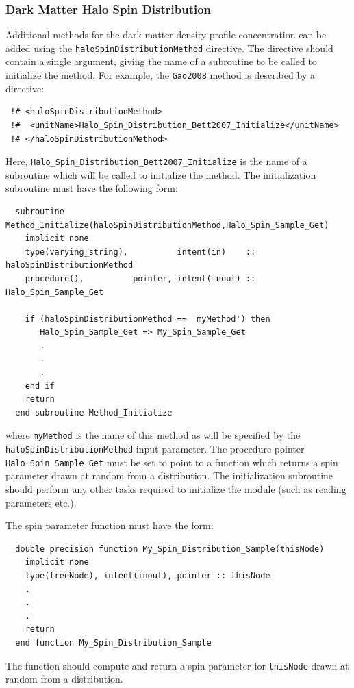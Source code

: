 \subsubsection{Dark Matter Halo Spin Distribution}\label{sec:HaloSpinDistribution}

Additional methods for the dark matter density profile concentration can be added using the {\tt haloSpinDistributionMethod} directive. The directive should contain a single argument, giving the name of a subroutine to be called to initialize the method. For example, the {\tt Gao2008} method is described by a directive:
\begin{verbatim}
 !# <haloSpinDistributionMethod>
 !#  <unitName>Halo_Spin_Distribution_Bett2007_Initialize</unitName>
 !# </haloSpinDistributionMethod>
\end{verbatim}
Here, {\tt Halo\_Spin\_Distribution\_Bett2007\_Initialize} is the name of a subroutine which will be called to initialize the method. The initialization subroutine must have the following form:
\begin{verbatim}
  subroutine Method_Initialize(haloSpinDistributionMethod,Halo_Spin_Sample_Get)
    implicit none
    type(varying_string),          intent(in)    :: haloSpinDistributionMethod
    procedure(),          pointer, intent(inout) :: Halo_Spin_Sample_Get
    
    if (haloSpinDistributionMethod == 'myMethod') then
       Halo_Spin_Sample_Get => My_Spin_Sample_Get
       .
       .
       .
    end if
    return
  end subroutine Method_Initialize
\end{verbatim}
where {\tt myMethod} is the name of this method as will be specified by the {\tt haloSpinDistributionMethod} input parameter. The procedure pointer {\tt Halo\_Spin\_Sample\_Get} must be set to point to a function which returns a spin parameter drawn at random from a distribution. The initialization subroutine should perform any other tasks required to initialize the module (such as reading parameters etc.).

The spin parameter function must have the form:
\begin{verbatim}
  double precision function My_Spin_Distribution_Sample(thisNode)
    implicit none
    type(treeNode), intent(inout), pointer :: thisNode
    .
    .
    .
    return
  end function My_Spin_Distribution_Sample
\end{verbatim}
The function should compute and return a spin parameter for {\tt thisNode} drawn at random from a distribution.

